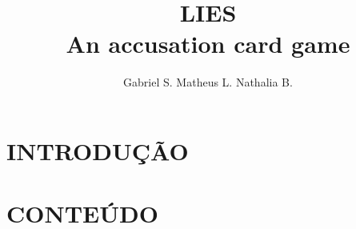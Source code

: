 \documentclass[a4paper, 11pt]{article}
\title{\textbf{LIES} \\ \small{An accusation card game}}
\author{Gabriel S. Matheus L. Nathalia B.}
\begin{document}
\maketitle

\newpage

\newpage

\section*{INTRODUÇÃO}


\section*{CONTEÚDO}
\end{document}
